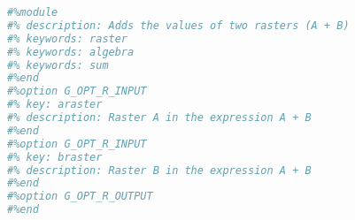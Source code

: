 \documentclass{standalone}
\begin{document}
\begin{lstlisting}[language=Python,linewidth=34.2em]
#%module
#% description: Adds the values of two rasters (A + B)
#% keywords: raster
#% keywords: algebra
#% keywords: sum
#%end
#%option G_OPT_R_INPUT
#% key: araster
#% description: Raster A in the expression A + B
#%end
#%option G_OPT_R_INPUT
#% key: braster
#% description: Raster B in the expression A + B
#%end
#%option G_OPT_R_OUTPUT
#%end
\end{lstlisting}
\end{document}
